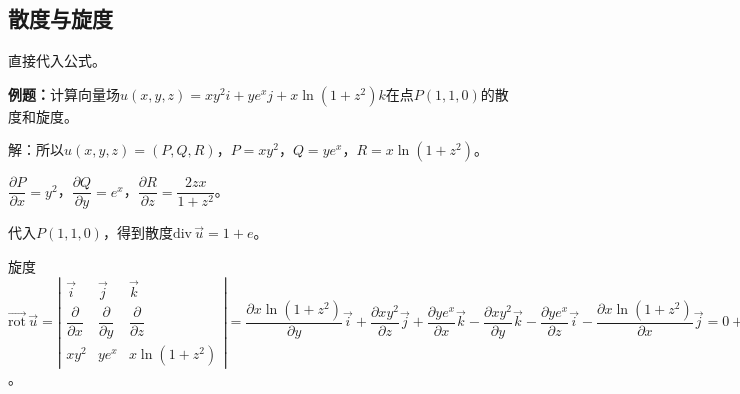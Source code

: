 \documentclass[UTF8, 12pt]{ctexart}
\begin{document}
\subsection{散度与旋度}

直接代入公式。

\textbf{例题：}计算向量场$u(x,y,z)=xy^2i+ye^xj+x\ln(1+z^2)k$在点$P(1,1,0)$的散度和旋度。

解：所以$u(x,y,z)=(P,Q,R)$，$P=xy^2$，$Q=ye^x$，$R=x\ln(1+z^2)$。

$\dfrac{\partial P}{\partial x}=y^2$，$\dfrac{\partial Q}{\partial y}=e^x$，$\dfrac{\partial R}{\partial z}=\dfrac{2zx}{1+z^2}$。

代入$P(1,1,0)$，得到散度$\textrm{div}\,\vec{u}=1+e$。

旋度$\overrightarrow{\textrm{rot}}\,\vec{u}=\left\vert\begin{array}{ccc}
    \vec{i} & \vec{j} & \vec{k} \\
    \dfrac{\partial}{\partial x} & \dfrac{\partial}{\partial y} & \dfrac{\partial}{\partial z} \\
    xy^2 & ye^x & x\ln(1+z^2)
\end{array}\right\vert=\dfrac{\partial x\ln(1+z^2)}{\partial y}\vec{i}+\dfrac{\partial xy^2}{\partial z}\vec{j}+\dfrac{\partial ye^x}{\partial x}\vec{k}-\dfrac{\partial xy^2}{\partial y}\vec{k}-\dfrac{\partial ye^x}{\partial z}\vec{i}-\dfrac{\partial x\ln(1+z^2)}{\partial x}\vec{j}=0+0+ye^x\vec{k}-2xy\vec{k}-0-\ln(1+z^2)\vec{j}=-\ln(1+z^2)\vec{j}+(ye^x-2xy)\vec{k}=(0,0,e-2)$。
\end{document}
